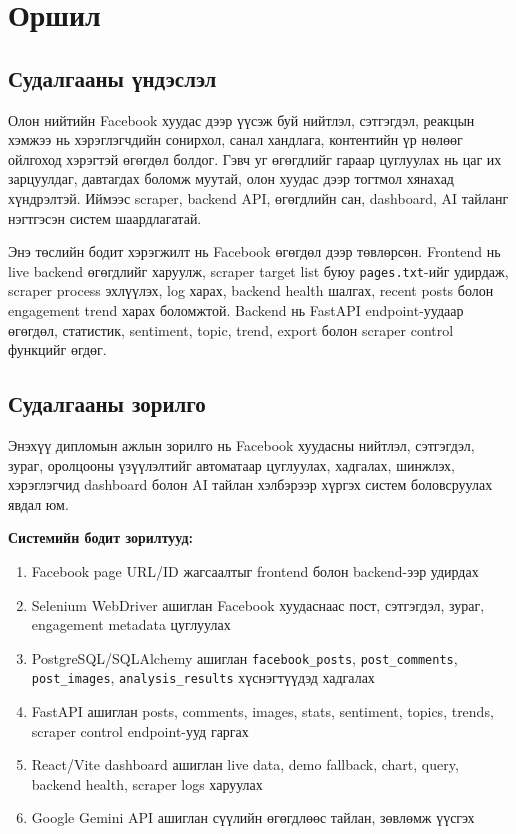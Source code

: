 \chapter{Оршил}
\label{Chapter1}

\section{Судалгааны үндэслэл}

Олон нийтийн Facebook хуудас дээр үүсэж буй нийтлэл, сэтгэгдэл, реакцын хэмжээ нь хэрэглэгчдийн сонирхол, санал хандлага, контентийн үр нөлөөг ойлгоход хэрэгтэй өгөгдөл болдог. Гэвч уг өгөгдлийг гараар цуглуулах нь цаг их зарцуулдаг, давтагдах боломж муутай, олон хуудас дээр тогтмол хянахад хүндрэлтэй. Иймээс scraper, backend API, өгөгдлийн сан, dashboard, AI тайланг нэгтгэсэн систем шаардлагатай.

Энэ төслийн бодит хэрэгжилт нь Facebook өгөгдөл дээр төвлөрсөн. Frontend нь live backend өгөгдлийг харуулж, scraper target list буюу \texttt{pages.txt}-ийг удирдаж, scraper process эхлүүлэх, log харах, backend health шалгах, recent posts болон engagement trend харах боломжтой. Backend нь FastAPI endpoint-уудаар өгөгдөл, статистик, sentiment, topic, trend, export болон scraper control функцийг өгдөг.

\section{Судалгааны зорилго}

Энэхүү дипломын ажлын зорилго нь Facebook хуудасны нийтлэл, сэтгэгдэл, зураг, оролцооны үзүүлэлтийг автоматаар цуглуулах, хадгалах, шинжлэх, хэрэглэгчид dashboard болон AI тайлан хэлбэрээр хүргэх систем боловсруулах явдал юм.

\textbf{Системийн бодит зорилтууд:}
\begin{enumerate}
    \item Facebook page URL/ID жагсаалтыг frontend болон backend-ээр удирдах
    \item Selenium WebDriver ашиглан Facebook хуудаснаас пост, сэтгэгдэл, зураг, engagement metadata цуглуулах
    \item PostgreSQL/SQLAlchemy ашиглан \texttt{facebook\_posts}, \texttt{post\_comments}, \texttt{post\_images}, \texttt{analysis\_results} хүснэгтүүдэд хадгалах
    \item FastAPI ашиглан posts, comments, images, stats, sentiment, topics, trends, scraper control endpoint-ууд гаргах
    \item React/Vite dashboard ашиглан live data, demo fallback, chart, query, backend health, scraper logs харуулах
    \item Google Gemini API ашиглан сүүлийн өгөгдлөөс тайлан, зөвлөмж үүсгэх
\end{enumerate}

